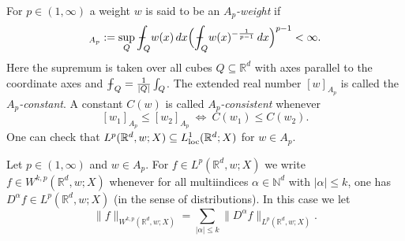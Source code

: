 \documentclass{amsart}
\theoremstyle{plain}
\theoremstyle{remark}
\theoremstyle{plain}
\numberwithin{equation}{section}
\begin{document}
For $p\in (1, \infty)$ a weight $w$ is said to be an {\em $A_{p}$-weight} if
\begin{align*}
   [w]_{A_{p}}:=\sup_{Q} {\mathchoice      {\mathop{\kern 0.2em\vrule width 0.6em height 0.69678ex depth -0.58065ex
              \kern -0.8em \intop}\nolimits_{\kern -0.4emQ}}      {\mathop{\kern 0.1em\vrule width 0.5em height 0.69678ex depth -0.60387ex
              \kern -0.6em \intop}\nolimits_{Q}}      {\mathop{\kern 0.1em\vrule width 0.5em height 0.69678ex depth -0.60387ex
              \kern -0.6em \intop}\nolimits_{Q}}      {\mathop{\kern 0.1em\vrule width 0.5em height 0.69678ex depth -0.60387ex
              \kern -0.6em \intop}\nolimits_{Q}}} w(x) \, dx \Big({\mathchoice      {\mathop{\kern 0.2em\vrule width 0.6em height 0.69678ex depth -0.58065ex
              \kern -0.8em \intop}\nolimits_{\kern -0.4emQ}}      {\mathop{\kern 0.1em\vrule width 0.5em height 0.69678ex depth -0.60387ex
              \kern -0.6em \intop}\nolimits_{Q}}      {\mathop{\kern 0.1em\vrule width 0.5em height 0.69678ex depth -0.60387ex
              \kern -0.6em \intop}\nolimits_{Q}}      {\mathop{\kern 0.1em\vrule width 0.5em height 0.69678ex depth -0.60387ex
              \kern -0.6em \intop}\nolimits_{Q}}} w(x)^{-\frac{1}{p-1}}\, dx \Big)^{p-1}<\infty.
\end{align*}
Here the supremum is taken over all cubes $Q\subseteq { \mathbb{R} }^d$ with axes parallel to the coordinate axes and ${\mathchoice      {\mathop{\kern 0.2em\vrule width 0.6em height 0.69678ex depth -0.58065ex
              \kern -0.8em \intop}\nolimits_{\kern -0.4em{Q}}}      {\mathop{\kern 0.1em\vrule width 0.5em height 0.69678ex depth -0.60387ex
              \kern -0.6em \intop}\nolimits_{{Q}}}      {\mathop{\kern 0.1em\vrule width 0.5em height 0.69678ex depth -0.60387ex
              \kern -0.6em \intop}\nolimits_{{Q}}}      {\mathop{\kern 0.1em\vrule width 0.5em height 0.69678ex depth -0.60387ex
              \kern -0.6em \intop}\nolimits_{{Q}}}} = \frac{1}{|Q|}\int_{Q}$. The extended real number $[w]_{A_{p}}$ is called the {\em $A_p$-constant}. A constant $C(w)$ is called {\em $A_{p}$-consistent} whenever \[[w_1]_{A_{p}}\leq [w_2]_{A_{p}} \ \Leftrightarrow \ C(w_1)\leq C(w_2).\]
One can check that $L^p({ \mathbb{R} }^d,w;X)\subseteq L^1_{\rm loc}({ \mathbb{R} }^d;X)$ for $w\in A_p$.

Let $p\in (1, \infty)$ and $w\in A_p$. For $f\in L^p({ \mathbb{R} }^d,w;X)$ we write $f\in W^{k,p}({ \mathbb{R} }^d,w;X)$ whenever for all multiindices $\alpha\in { \mathbb{N} }^d$ with $|\alpha|\leq k$, one has
$D^{\alpha} f\in L^p({ \mathbb{R} }^d,w;X)$ (in the sense of distributions). In this case we let
\[\|f\|_{W^{k, p}({ \mathbb{R} }^d,w;X)} = \sum_{|\alpha|\leq k} \|D^{\alpha} f\|_{L^p({ \mathbb{R} }^d,w;X)}.\]
\end{document}
